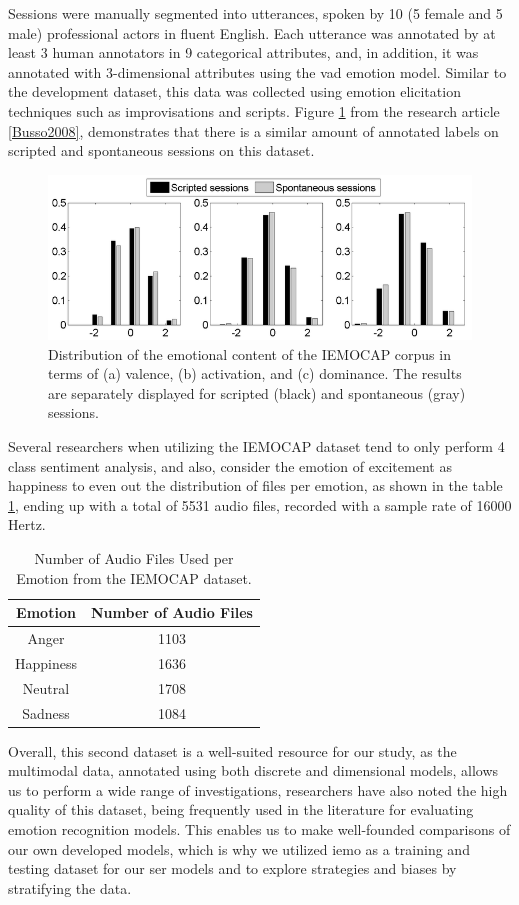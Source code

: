 Sessions were manually segmented into utterances, spoken by 10 (5 female and 5 male) professional actors in fluent English. Each utterance was annotated by at least 3 human annotators in 9 categorical attributes, and, in addition, it was annotated with 3-dimensional attributes using the \ac{vad} emotion model. Similar to the development dataset, this data was collected using emotion elicitation techniques such as improvisations and scripts. Figure \ref{fig:bar_plots_distribution} from the research article \ref{Busso2008}, demonstrates that there is a similar amount of annotated labels on scripted and spontaneous sessions on this dataset.

\begin{figure}[H]
	\centering
	\includegraphics[width=.8\linewidth]{figs/4_1_traditional/scripted_spont_distribution.png}
	\caption{Distribution of the emotional content of the IEMOCAP corpus in terms of (a) valence, (b) activation, and (c) dominance. The results are separately displayed for scripted (black) and spontaneous (gray) sessions.}
	\label{fig:bar_plots_distribution}
\end{figure}

Several researchers when utilizing the IEMOCAP dataset tend to only perform 4 class sentiment analysis, and also, consider the emotion of excitement as happiness to even out the distribution of files per emotion, as shown in the table \ref{tab:dataDist}, ending up with a total of 5531 audio files, recorded with a sample rate of 16000 Hertz.

\begin{table}[H]
	\centering
	\caption{Number of Audio Files Used per Emotion from the IEMOCAP dataset.}
	\label{tab:dataDist}
	\begin{tabular}{cc}
		\toprule
		Emotion & Number of Audio Files \\
		\midrule
		Anger & 1103\\
		Happiness &  1636\\
		Neutral &  1708\\
		Sadness & 1084\\
		\bottomrule
	\end{tabular}
\end{table}


Overall, this second dataset is a well-suited resource for our study, as the multimodal data, annotated using both discrete and dimensional models, allows us to perform a wide range of investigations, researchers have also noted the high quality of this dataset, being frequently used in the literature for evaluating emotion recognition models. This enables us to make well-founded comparisons of our own developed models, which is why we utilized \ac{iemo} as a training and testing dataset for our \ac{ser} models and to explore strategies and biases by stratifying the data.

